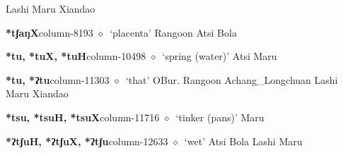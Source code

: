 \hspace{1ex}
         Lashi 
\hspace{1ex}
         Maru 
\hspace{1ex}
         Xiandao 
  \item {\footnotesize \textbf{*tʃaŋX}}{\tiny column-8193}
         $\diamond$~`placenta'
         Rangoon 
\hspace{1ex}
         Atsi 
\hspace{1ex}
         Bola 
  \item {\footnotesize \textbf{*tu, *tuX, *tuH}}{\tiny column-10498}
         $\diamond$~`spring (water)'
         Atsi 
\hspace{1ex}
         Maru 
  \item {\footnotesize \textbf{*tu, *ʔtu}}{\tiny column-11303}
         $\diamond$~`that'
         OBur. 
\hspace{1ex}
         Rangoon 
\hspace{1ex}
         Achang\_Longchuan 
\hspace{1ex}
         Lashi 
\hspace{1ex}
         Maru 
\hspace{1ex}
         Xiandao 
  \item {\footnotesize \textbf{*tsu, *tsuH, *tsuX}}{\tiny column-11716}
         $\diamond$~`tinker (pans)'
         Maru 
  \item {\footnotesize \textbf{*ʔtʃuH, *ʔtʃuX, *ʔtʃu}}{\tiny column-12633}
         $\diamond$~`wet'
         Atsi 
\hspace{1ex}
         Bola 
\hspace{1ex}
         Lashi 
\hspace{1ex}
         Maru 
\hspace{1ex}

